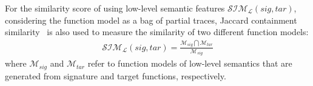 For the similarity score of using low-level semantic features $\mathcal{SIM_{L}}(sig, tar)$, considering the function model as a bag of partial traces, Jaccard containment similarity~\cite{agrawal2010indexing} is also used to measure the similarity of two different function models:
\begin{equation}
\begin{aligned}
 \mathcal{SIM_{L}}(sig, tar)  = \frac{\mathcal{M}_{sig} \bigcap \mathcal{M}_{tar}}{\mathcal{M}_{sig}}
\end{aligned}
\end{equation}
where $\mathcal{M}_{sig}$ and $\mathcal{M}_{tar}$ refer to function models of low-level semantics that are generated from signature and target functions, respectively.

%


